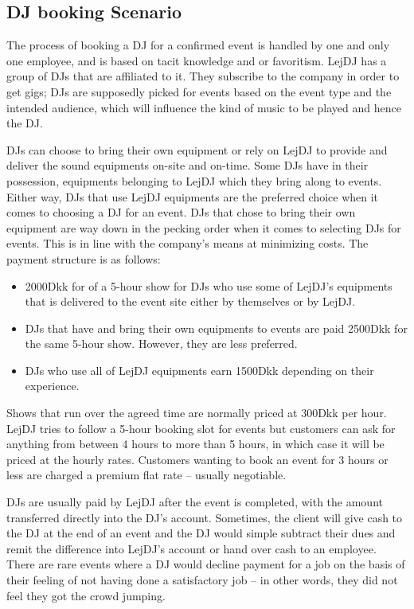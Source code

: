 \documentclass[envcountsame]{llncs}
\begin{document}
\subsection{DJ booking Scenario}

The process of booking a DJ for a confirmed event is handled by one
and only one employee, and is based on tacit knowledge and or
favoritism. LejDJ has a group of DJs that are affiliated to it. They
subscribe to the company in order to get gigs; DJs are supposedly
picked for events based on the event type and the intended audience,
which will influence the kind of music to be played and hence the DJ.

DJs can choose to bring their own equipment or rely on LejDJ to
provide and deliver the sound equipments on-site and on-time. Some DJs
have in their possession, equipments belonging to LejDJ which they
bring along to events. Either way, DJs that use LejDJ equipments are
the preferred choice when it comes to choosing a DJ for an event. DJs
that chose to bring their own equipment are way down in the pecking
order when it comes to selecting DJs for events. This is in line with
the company’s means at minimizing costs. The payment structure is as
follows:

\begin{itemize}
\item 2000Dkk for of a 5-hour show for DJs who use some of LejDJ’s
  equipments that is delivered to the event site either by themselves
  or by LejDJ.
\item DJs that have and bring their own equipments to events are paid
  2500Dkk for the same 5-hour show. However, they are less preferred.
\item DJs who use all of LejDJ equipments earn 1500Dkk depending on
  their experience.
\end{itemize}

Shows that run over the agreed time are normally priced at 300Dkk per
hour. LejDJ tries to follow a 5-hour booking slot for events but
customers can ask for anything from between 4 hours to more than 5
hours, in which case it will be priced at the hourly rates. Customers
wanting to book an event for 3 hours or less are charged a premium
flat rate -- usually negotiable.

DJs are usually paid by LejDJ after the event is completed, with the
amount transferred directly into the DJ’s account. Sometimes, the
client will give cash to the DJ at the end of an event and the DJ
would simple subtract their dues and remit the difference into LejDJ’s
account or hand over cash to an employee.  There are rare events where
a DJ would decline payment for a job on the basis of their feeling of
not having done a satisfactory job -- in other words, they did not feel
they got the crowd jumping. 
\end{document}
